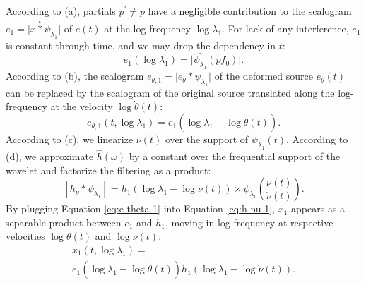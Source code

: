 \documentclass[twoside,a4paper]{article}
\begin{document}
According to (a), partials $p^{\prime} \neq p$ have a negligible contribution to the scalogram $e_1 = \vert x \overset{t}{\ast} \psi_{\lambda_1} \vert$ of $e(t)$ at the log-frequency $\log \lambda_1$. For lack of any interference, $e_1$ is constant through time, and we may drop the dependency in $t$:
\begin{equation}
e_{1}(\log \lambda_1) = \vert \widehat{\psi_{\lambda_1}}(p f_0) \vert.
\end{equation}
According to (b), the scalogram $e_{\theta,1} = \vert e_{\theta} \ast \psi_{\lambda_1} \vert$ of the deformed source $e_\theta (t)$ can be replaced by the scalogram of the original source translated along the log-frequency at the velocity $\log \dot{\theta}(t)$:
\begin{equation}
e_{\theta,1}(t,\log \lambda_1) = e_{1}(\log \lambda_1 - \log \dot{\theta}(t)).
\label{eq:e-theta-1}
\end{equation}
According to (c), we linearize $\nu(t)$ over the support of $\psi_{\lambda_1}(t)$.
According to (d), we approximate $\hat{h}(\omega)$ by a constant over the frequential support of the wavelet and factorize the filtering as a product:
\begin{equation}
\left[ h_\nu \ast \psi_{\lambda_1} \right] =
h_{1}(\log \lambda_1 - \log \dot{\nu}(t)) \times
\psi_{\lambda_1}\left( \frac{\nu(t)}{\dot{\nu}(t)} \right).
\label{eq:h-nu-1}
\end{equation}
By plugging Equation \ref{eq:e-theta-1} into Equation \ref{eq:h-nu-1}, $x_1$ appears as a separable product between $e_1$ and $h_1$, moving in log-frequency at respective velocities $\log \dot{\theta}(t)$ and $\log \dot{\nu}(t)$:
\begin{multline}
x_1(t,\log \lambda_1) = \\
e_{1}(\log \lambda_1 - \log \dot{\theta}(t))
h_{1}(\log \lambda_1 - \log \dot{\nu}(t)).
\label{eq:factorization}
\end{multline}
\end{document}

